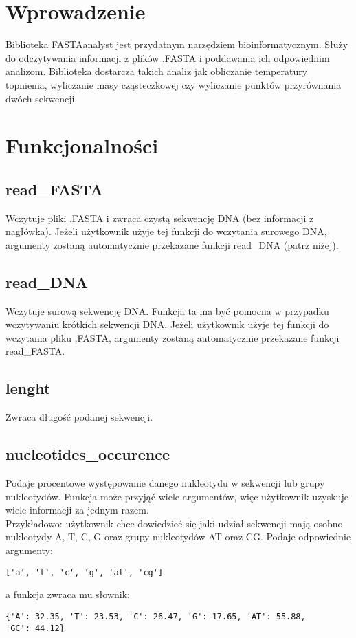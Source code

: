 \documentclass[11pt,a4paper]{mwart}
\begin{document}
	\section{Wprowadzenie}
		Biblioteka FASTAanalyst jest przydatnym narzędziem bioinformatycznym.
		Służy do odczytywania informacji z plików .FASTA i poddawania ich 
		odpowiednim analizom. Biblioteka dostarcza takich analiz jak obliczanie
		temperatury topnienia, wyliczanie masy cząsteczkowej czy wyliczanie 
		punktów przyrównania dwóch sekwencji.
	\section{Funkcjonalności}
		\subsection{read\_FASTA}
			Wczytuje pliki .FASTA i zwraca czystą sekwencję DNA (bez informacji
			z nagłówka). Jeżeli użytkownik użyje tej funkcji do wczytania surowego
			DNA, argumenty zostaną automatycznie przekazane funkcji 
			\textsf{read\_DNA} (patrz niżej).
		\subsection{read\_DNA}
			Wczytuje surową sekwencję DNA. Funkcja ta ma być pomocna w przypadku 
			wczytywaniu krótkich sekwencji DNA. Jeżeli użytkownik użyje tej funkcji 
			do wczytania pliku .FASTA, argumenty zostaną automatycznie przekazane 	
			funkcji \textsf{read\_FASTA}.
		\subsection{lenght}
			Zwraca długość podanej sekwencji.
		\subsection{nucleotides\_occurence}
			Podaje procentowe występowanie danego nukleotydu w sekwencji lub grupy
			nukleotydów. Funkcja może przyjąć wiele argumentów, więc użytkownik
			uzyskuje wiele informacji za jednym razem.\\
			\indent Przykładowo: użytkownik chce dowiedzieć się jaki udział
			sekwencji mają osobno nukleotydy A, T, C, G oraz grupy nukleotydów AT 
			oraz CG. Podaje odpowiednie argumenty:
			\begin{lstlisting}
['a', 't', 'c', 'g', 'at', 'cg']
			\end{lstlisting}
			a funkcja zwraca mu słownik:
			\begin{lstlisting}
{'A': 32.35, 'T': 23.53, 'C': 26.47, 'G': 17.65, 'AT': 55.88,
'GC': 44.12}
			\end{lstlisting}
\end{document}
